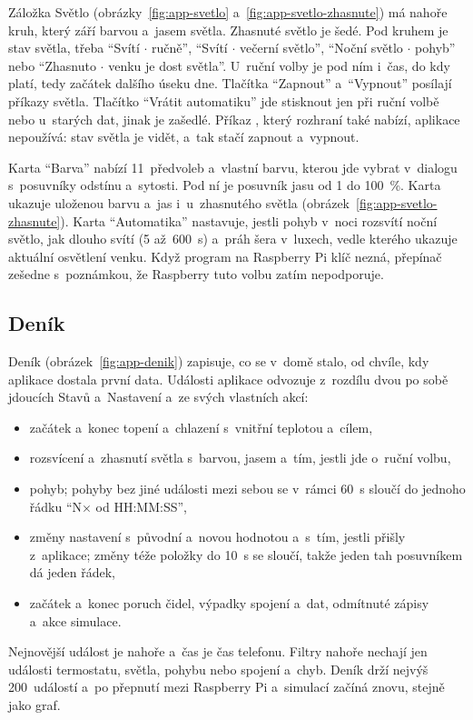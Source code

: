 Záložka Světlo (obrázky~\ref{fig:app-svetlo} a~\ref{fig:app-svetlo-zhasnute}) má nahoře kruh,
který září barvou a~jasem světla. Zhasnuté světlo je šedé. Pod kruhem je stav světla, třeba
\enquote{Svítí $\cdot$ ručně}, \enquote{Svítí $\cdot$ večerní světlo}, \enquote{Noční světlo
$\cdot$ pohyb} nebo \enquote{Zhasnuto $\cdot$ venku je dost světla}. U~ruční volby je pod ním
i~čas, do kdy platí, tedy začátek dalšího úseku dne. Tlačítka \enquote{Zapnout}
a~\enquote{Vypnout} posílají příkazy světla. Tlačítko \enquote{Vrátit automatiku} jde stisknout
jen při ruční volbě nebo u~starých dat, jinak je zašedlé. Příkaz , který rozhraní
také nabízí, aplikace nepoužívá: stav světla je vidět, a~tak stačí zapnout a~vypnout.

Karta \enquote{Barva} nabízí 11~předvoleb a~vlastní barvu, kterou jde vybrat v~dialogu
s~posuvníky odstínu a~sytosti. Pod ní je posuvník jasu od 1 do 100~\%. Karta ukazuje uloženou
barvu a~jas i~u~zhasnutého světla (obrázek~\ref{fig:app-svetlo-zhasnute}). Karta
\enquote{Automatika} nastavuje, jestli pohyb v~noci rozsvítí noční světlo, jak dlouho svítí
(5 až~600~s) a~práh šera v~luxech, vedle kterého ukazuje aktuální osvětlení venku. Když program
na Raspberry Pi klíč  nezná, přepínač zešedne s~poznámkou, že
Raspberry tuto volbu zatím nepodporuje.

\subsection{Deník}

Deník (obrázek~\ref{fig:app-denik}) zapisuje, co se v~domě stalo, od chvíle, kdy aplikace
dostala první data. Události aplikace odvozuje z~rozdílu dvou po sobě jdoucích Stavů
a~Nastavení a~ze svých vlastních akcí:
\begin{itemize}
  \item začátek a~konec topení a~chlazení s~vnitřní teplotou a~cílem,
  \item rozsvícení a~zhasnutí světla s~barvou, jasem a~tím, jestli jde o~ruční volbu,
  \item pohyb; pohyby bez jiné události mezi sebou se v~rámci 60~s sloučí do jednoho řádku
        \enquote{N$\times$ od HH:MM:SS},
  \item změny nastavení s~původní a~novou hodnotou a~s~tím, jestli přišly z~aplikace; změny
        téže položky do 10~s se sloučí, takže jeden tah posuvníkem dá jeden řádek,
  \item začátek a~konec poruch čidel, výpadky spojení a~dat, odmítnuté zápisy a~akce simulace.
\end{itemize}
Nejnovější událost je nahoře a~čas je čas telefonu. Filtry nahoře nechají jen události
termostatu, světla, pohybu nebo spojení a~chyb. Deník drží nejvýš 200~událostí a~po přepnutí
mezi Raspberry Pi a~simulací začíná znovu, stejně jako graf.

